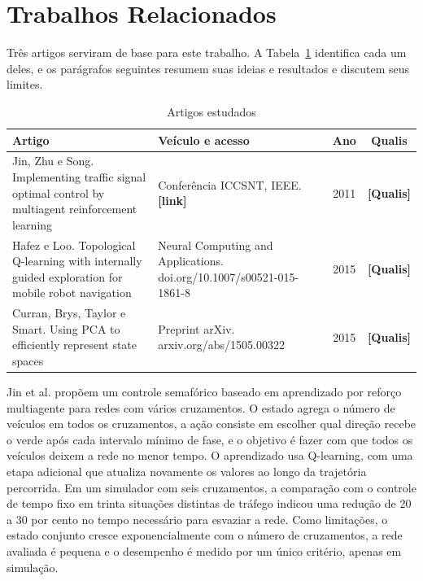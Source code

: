 \documentclass[12pt]{article}
\newcommand{\pendente}[1]{\textbf{[#1]}}
\begin{document}
\section{Trabalhos Relacionados}\label{sec:relacionados}

Três artigos serviram de base para este trabalho. A Tabela~\ref{tab:artigos} identifica cada um deles, e os parágrafos
seguintes resumem suas ideias e resultados e discutem seus limites.

\begin{table}[ht]
\centering
\caption{Artigos estudados}
\label{tab:artigos}
\footnotesize
\begin{tabular}{>{\raggedright\arraybackslash}p{5.4cm}>{\raggedright\arraybackslash}p{4.6cm}cc}
\toprule
Artigo & Veículo e acesso & Ano & Qualis \\
\midrule
Jin, Zhu e Song. Implementing traffic signal optimal control by multiagent reinforcement learning
  & Conferência ICCSNT, IEEE. \pendente{link} & 2011 & \pendente{Qualis} \\
Hafez e Loo. Topological Q-learning with internally guided exploration for mobile robot navigation
  & Neural Computing and Applications. doi.org/10.1007/s00521-015-1861-8 & 2015 & \pendente{Qualis} \\
Curran, Brys, Taylor e Smart. Using PCA to efficiently represent state spaces
  & Preprint arXiv. arxiv.org/abs/1505.00322 & 2015 & \pendente{Qualis} \\
\bottomrule
\end{tabular}
\end{table}

Jin et al. \cite{Jin2011} propõem um controle semafórico baseado em aprendizado por reforço multiagente para redes com
vários cruzamentos. O estado agrega o número de veículos em todos os cruzamentos, a ação consiste em escolher qual direção
recebe o verde após cada intervalo mínimo de fase, e o objetivo é fazer com que todos os veículos deixem a rede no menor
tempo. O aprendizado usa Q-learning, com uma etapa adicional que atualiza novamente os valores ao longo da trajetória
percorrida. Em um simulador com seis cruzamentos, a comparação com o controle de tempo fixo em trinta situações distintas
de tráfego indicou uma redução de 20 a 30 por cento no tempo necessário para esvaziar a rede. Como limitações, o estado
conjunto cresce exponencialmente com o número de cruzamentos, a rede avaliada é pequena e o desempenho é medido por um
único critério, apenas em simulação.
\end{document}
